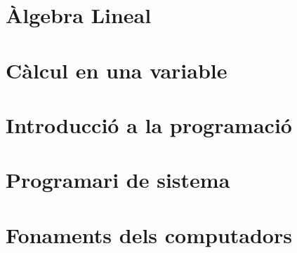 \documentclass[a4paper,12pt]{article}
\theoremstyle{remark}
\theoremstyle{definition}
\begin{document}
    
    \tableofcontents
    \section{Àlgebra Lineal}
    
    \section{Càlcul en una variable}
    
    \section{Introducció a la programació}
    
    \section{Programari de sistema}
    
    \section{Fonaments dels computadors}
    
\end{document}
